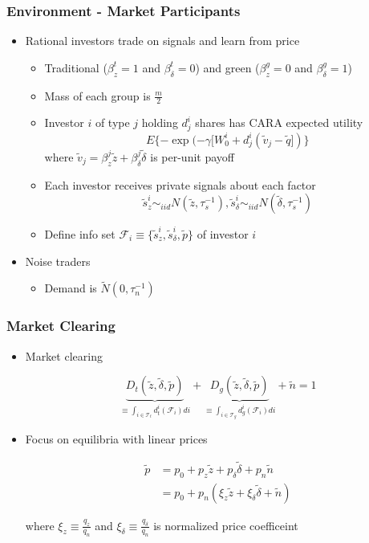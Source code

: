 \documentclass{beamer}
\begin{document}
\begin{frame}
\frametitle{Environment - Market Participants}
\begin{itemize}[<+->]
\item Rational investors trade on signals and learn from price
\begin{itemize}[<+->]
\item Traditional ($\beta_z^t = 1$ and $\beta_\delta^t = 0$) and green ($\beta_z^g = 0$ and $\beta_\delta^g = 1$)
\item Mass of each group is $\frac{m}{2}$
\item Investor $i$ of type $j$ holding $d_j^i$ shares has CARA expected utility
$$
E\{ - \exp (-\gamma [W_0^i + d_j^i(\tilde v_j - \tilde q])\}
$$
where $\tilde v_j = \beta_z^j \tilde z + \beta_\delta^j \tilde \delta$ is per-unit payoff
\item Each investor receives private signals about each factor
$$
\tilde s^i_z \sim_{iid} N(\tilde z, \tau_s^{-1}), \tilde s^i_\delta \sim_{iid} N(\tilde \delta, \tau_s^{-1})
$$
\item Define info set $\mathcal{F}_i \equiv \{\tilde s^i_z, \tilde s^i_\delta, \tilde p\}$ of investor $i$
\end{itemize}
\bigskip
\item Noise traders
\begin{itemize}[<+->]
\item Demand is $\tilde N(0, \tau_n^{-1})$
\end{itemize}
\end{itemize}
\end{frame}



\begin{frame}
\frametitle{Market Clearing}
\begin{itemize}[<+->]
\item Market clearing

$$
\underbrace{D_t(\tilde z, \tilde \delta, \tilde p)}_{\equiv \int_{i \in \mathcal{T}_t} d_t^i(\mathcal{F}_i)di} + \underbrace{D_g(\tilde z, \tilde \delta, \tilde p)}_{\equiv \int_{i \in \mathcal{T}_g} d_g^i(\mathcal{F}_i) di} + \tilde n = 1
$$

\bigskip

\item Focus on equilibria with linear prices

\begin{align*}
\tilde p 
&= p_0 + p_z \tilde z + p_\delta \tilde \delta + p_n \tilde n \\
&= p_0 + p_n(\xi_z \tilde z + \xi_\delta \tilde \delta + \tilde n) 
\end{align*}

where $\xi_z \equiv \frac{q_z}{q_n}$ and  $\xi_\delta \equiv \frac{q_\delta}{q_n}$ is normalized price coefficeint


\end{itemize}
\end{frame}
\end{document}
